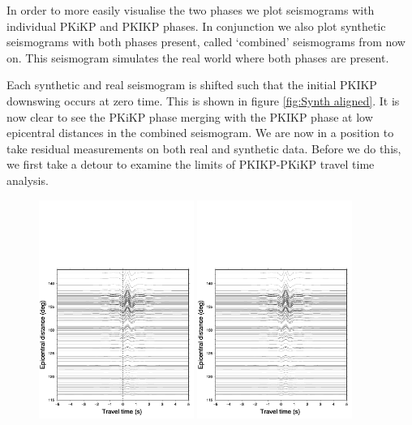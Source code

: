 \documentclass[11pt,a4paper]{article}
\begin{document}
In order to more easily visualise the two phases we plot seismograms with individual PKiKP and PKIKP phases. In conjunction we also plot synthetic seismograms with both phases present, called `combined' seismograms from now on. This seismogram simulates the real world where both phases are present.

Each synthetic and real seismogram is shifted such that the initial PKIKP downswing occurs at zero time. This is shown in figure \ref{fig:Synth aligned}. It is now clear to see the PKiKP phase merging with the PKIKP phase at low epicentral distances in the combined seismogram. We are now in a position to take residual measurements on both real and synthetic data. Before we do this, we first take a detour to examine the limits of PKIKP-PKiKP travel time analysis.

\begin{figure}
	\centering
	\includegraphics[width=0.45\textwidth]{figures/bandasea/bandasea_PKIKP_aligned-1}
	\includegraphics[width=0.45\textwidth]{figures/bandasea/bandasea_PKiKP_aligned}

\end{figure}
\end{document}
